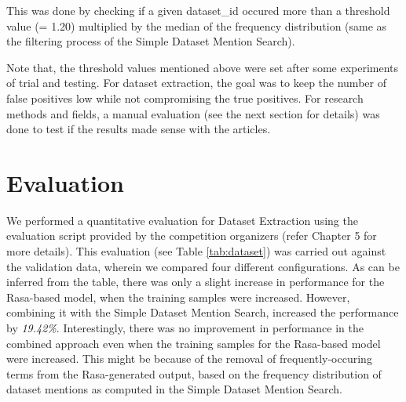 \documentclass[runningheads]{llncs}
\begin{document}
\begin{enumerate}
This was done by checking if a given dataset\_id occured more than a threshold value (= 1.20) multiplied by the median of the frequency distribution (same as the filtering process of the Simple Dataset Mention Search). %
\end{enumerate} 

Note that, the threshold values mentioned above were set after some experiments of trial and testing. For dataset extraction, the goal was to keep the number of false positives low while not compromising the true positives. %
For research methods and fields, a manual evaluation (see the next section for details) was done to test if the results made sense with the articles.

\section{Evaluation}
We performed a quantitative evaluation for Dataset Extraction using the evaluation script provided by the competition organizers (refer Chapter 5 for more details). This evaluation (see Table \ref{tab:dataset}) was carried out against the validation data, wherein we compared four different configurations. As can be inferred from the table, %
there was only a slight increase in performance for the Rasa-based model, when the training samples were increased. However, combining it with the Simple Dataset Mention Search, increased the performance by \emph{19.42\%}. Interestingly, there was no improvement in performance in the combined approach even when the training samples for the Rasa-based model were increased. This might be because of the removal of frequently-occuring terms from the Rasa-generated output, based on the frequency distribution of dataset mentions as computed in the Simple Dataset Mention Search.  \\
\end{document}
